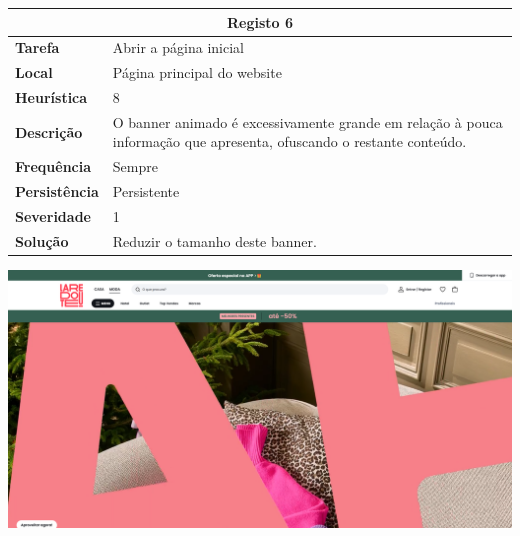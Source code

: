 \documentclass[a4paper,12pt]{article}
\begin{document}
\begin{center}
    \newpage
    \begin{table}[h!]
        \centering
        \begin{tabular}{|m{3cm}|m{12cm}|}
        \hline
        \multicolumn{2}{|c|}{\textbf{Registo 6}} \\ \hline
        \textbf{Tarefa}       & Abrir a página inicial \\ \hline
        \textbf{Local}        & Página principal do website \\ \hline
        \textbf{Heurística}   & 8  \\ \hline
        \textbf{Descrição}    & O banner animado é excessivamente grande em relação à pouca informação que apresenta, ofuscando o restante conteúdo. \\ \hline
        \textbf{Frequência}   & Sempre \\ \hline
        \textbf{Persistência} & Persistente \\ \hline
        \textbf{Severidade}   & 1 \\ \hline
        \textbf{Solução}      &Reduzir o tamanho deste banner. \\ \hline
        \end{tabular}
    \end{table}
    
    \vspace{0.5cm}
    \includegraphics[width=\textwidth, keepaspectratio]{heuristics/05informacao_homepage.png}


\end{center}
\end{document}
